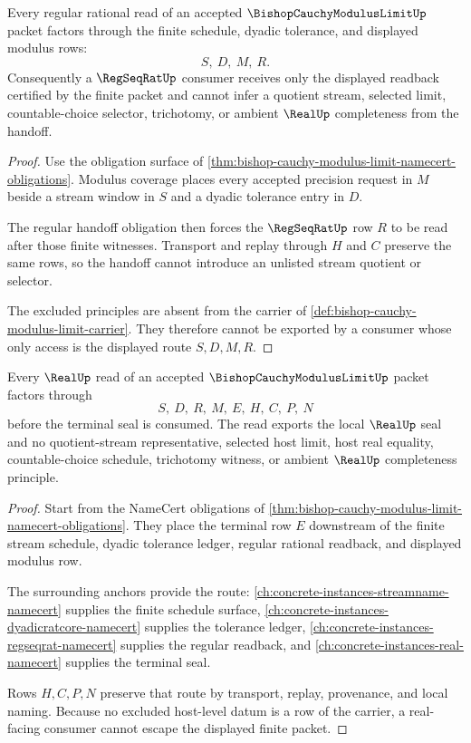 \begin{theorem}
\label{thm:bishop-cauchy-modulus-limit-regular-handoff}
Every regular rational read of an accepted $\BishopCauchyModulusLimitUp$ packet factors through the finite schedule, dyadic tolerance, and displayed modulus rows:
$$
S,\ D,\ M,\ R.
$$
Consequently a $\RegSeqRatUp$ consumer receives only the displayed readback certified by the finite packet and cannot infer a quotient stream, selected limit, countable-choice selector, trichotomy, or ambient $\RealUp$ completeness from the handoff.
\end{theorem}
\begin{proof}
Use the obligation surface of \autoref{thm:bishop-cauchy-modulus-limit-namecert-obligations}. Modulus coverage places every accepted precision request in $M$ beside a stream window in $S$ and a dyadic tolerance entry in $D$.

The regular handoff obligation then forces the $\RegSeqRatUp$ row $R$ to be read after those finite witnesses. Transport and replay through $H$ and $C$ preserve the same rows, so the handoff cannot introduce an unlisted stream quotient or selector.

The excluded principles are absent from the carrier of \autoref{def:bishop-cauchy-modulus-limit-carrier}. They therefore cannot be exported by a consumer whose only access is the displayed route $S,D,M,R$.
\end{proof}

\begin{theorem}
\label{thm:bishop-cauchy-modulus-limit-real-seal-nonescape}
Every $\RealUp$ read of an accepted $\BishopCauchyModulusLimitUp$ packet factors through
$$
S,\ D,\ R,\ M,\ E,\ H,\ C,\ P,\ N
$$
before the terminal seal is consumed. The read exports the local $\RealUp$ seal and no quotient-stream representative, selected host limit, host real equality, countable-choice schedule, trichotomy witness, or ambient $\RealUp$ completeness principle.
\end{theorem}
\begin{proof}
Start from the NameCert obligations of \autoref{thm:bishop-cauchy-modulus-limit-namecert-obligations}. They place the terminal row $E$ downstream of the finite stream schedule, dyadic tolerance ledger, regular rational readback, and displayed modulus row.

The surrounding anchors provide the route: \autoref{ch:concrete-instances-streamname-namecert} supplies the finite schedule surface, \autoref{ch:concrete-instances-dyadicratcore-namecert} supplies the tolerance ledger, \autoref{ch:concrete-instances-regseqrat-namecert} supplies the regular readback, and \autoref{ch:concrete-instances-real-namecert} supplies the terminal seal.

Rows $H,C,P,N$ preserve that route by transport, replay, provenance, and local naming. Because no excluded host-level datum is a row of the carrier, a real-facing consumer cannot escape the displayed finite packet.
\end{proof}

